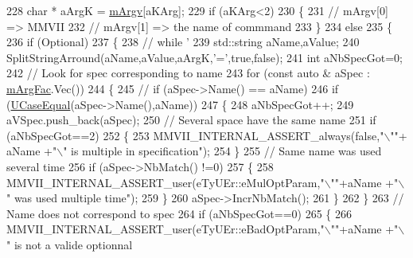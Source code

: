 \begin{DoxyCode}
228       \textcolor{keywordtype}{char} * aArgK = \hyperlink{classMMVII_1_1cMMVII__Appli_a5dce048e1b8e02d6b27096b9f3ce233e}{mArgv}[aKArg];
229       \textcolor{keywordflow}{if} (aKArg<2)
230       \{
231           \textcolor{comment}{//  mArgv[0] => MMVII}
232           \textcolor{comment}{//  mArgv[1] => the name of commmand}
233       \}
234       \textcolor{keywordflow}{else}
235       \{
236           \textcolor{keywordflow}{if} (Optional)
237           \{
238              \textcolor{comment}{// while '}
239              std::string aName,aValue;
240              SplitStringArround(aName,aValue,aArgK,\textcolor{charliteral}{'='},\textcolor{keyword}{true},\textcolor{keyword}{false});
241              \textcolor{keywordtype}{int} aNbSpecGot=0;
242              \textcolor{comment}{// Look for spec corresponding to name}
243              \textcolor{keywordflow}{for} (\textcolor{keyword}{const} \textcolor{keyword}{auto}  & aSpec : \hyperlink{classMMVII_1_1cMMVII__Appli_a18ca3cf743bc5d1c3f9250d0302fe25f}{mArgFac}.Vec())
244              \{
245                  \textcolor{comment}{// if (aSpec->Name() == aName)}
246                  \textcolor{keywordflow}{if} (\hyperlink{uti__string_8cpp_adff43fe7f0f569171eefb1aeafe2d0a3}{UCaseEqual}(aSpec->Name(),aName))
247                  \{
248                     aNbSpecGot++;
249                     aVSpec.push\_back(aSpec);
250                     \textcolor{comment}{// Several space have the same name}
251                     \textcolor{keywordflow}{if} (aNbSpecGot==2)
252                     \{
253                         MMVII\_INTERNAL\_ASSERT\_always(\textcolor{keyword}{false},\textcolor{stringliteral}{"\(\backslash\)""}+ aName +\textcolor{stringliteral}{"\(\backslash\)" is multiple in specification"});
254                     \}
255                     \textcolor{comment}{// Same name was used several time}
256                     \textcolor{keywordflow}{if} (aSpec->NbMatch() !=0)
257                     \{
258                         MMVII\_INTERNAL\_ASSERT\_user(eTyUEr::eMulOptParam,\textcolor{stringliteral}{"\(\backslash\)""}+aName +\textcolor{stringliteral}{"\(\backslash\)" was used multiple
       time"});
259                     \}
260                     aSpec->IncrNbMatch();
261                  \}
262              \}
263              \textcolor{comment}{// Name does not correspond to spec}
264              \textcolor{keywordflow}{if} (aNbSpecGot==0)
265              \{
266                 MMVII\_INTERNAL\_ASSERT\_user(eTyUEr::eBadOptParam,\textcolor{stringliteral}{"\(\backslash\)""}+aName +\textcolor{stringliteral}{"\(\backslash\)" is not a valide optionnal
}
\end{DoxyCode}
